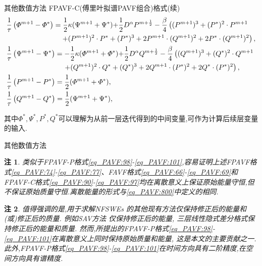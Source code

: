\documentclass[aspectratio=169]{beamer}
\newtheorem{remark}{注}[section] %
\numberwithin{theorem}{section} %
\numberwithin{equation}{section}%
\numberwithin{figure}{section}%
\numberwithin{table}{section}%
\begin{document}
\begin{frame}{其他数值方法}
	\noindent FPAVF-C(傅里叶拟谱PAVF组合)格式(续)
	{\small\begin{align}\footnotesize
	&\frac{1}{\tau}\left(\varPhi^{m+1}-\varPhi^{*}\right)=\frac{1}{2}\kappa (\Psi^{m+1}+\Psi^{*}){+\frac{1}{2}D^{\alpha} P^{m+\frac{1}{2}}}-\frac{\beta}{4}\left((P^{m+1})^3+(P^{*})^{2}\cdot P^{m+1}\right.\nonumber\\
			&~~~~~~~~~~~~~~~~~~~~~~~\left.+(P^{m+1})^{2}\cdot P^{*}+ (P^{*})^{3}+2 P^{m+1}\cdot (Q^{m+1})^{2}+2 P^{*}\cdot (Q^{m+1})^{2}\right),\label{eq_PAVF:94}\\
	&\frac{1}{\tau}\left(\Psi^{m+1}-\Psi^{*}\right)=-\frac{1}{2}\kappa (\varPhi^{m+1}+\varPhi^{*}){+\frac{1}{2}D^{\alpha} Q^{m+\frac{1}{2}}}-\frac{\beta}{4}\left((Q^{m+1})^3+(Q^{*})^{2}\cdot Q^{m+1}\right.\nonumber\\
			&~~~~~~~~~~~~~~~~~~~~~~~~\left.+(Q^{m+1})^{2}\cdot Q^{*}+ (Q^{*})^{3}+2 Q^{m+1}\cdot (P^{*})^{2}+2 Q^{*}\cdot (P^{*})^{2}\right),\label{eq_PAVF:95}\\
	&\frac{1}{\tau}\left(P^{m+1}-P^{*}\right)=\frac{1}{2}(\varPhi^{m+1}+\varPhi^{*}),\label{eq_PAVF:96}\\
	&\frac{1}{\tau}\left(Q^{m+1}-Q^{*}\right)=\frac{1}{2}(\Psi^{m+1}+\Psi^{*}),\label{eq_PAVF:97}
	\end{align}}
	
	\noindent 其中$\Phi^*, \Psi^*, P^*, Q^*$可以理解为从前一层迭代得到的中间变量,可作为计算后续层变量的输入.
\end{frame}
\begin{frame}{其他数值方法}

	\begin{remark}\label{rk_PAVF:1}
		类似于FPAVF-P格式\eqref{eq_PAVF:98}-\eqref{eq_PAVF:101},容易证明上述FPAVF格式\eqref{eq_PAVF:74}-\eqref{eq_PAVF:77}、FAVF格式\eqref{eq_PAVF:66}-\eqref{eq_PAVF:69}和FPAVF-C格式\eqref{eq_PAVF:90}-\eqref{eq_PAVF:97}均在离散意义上保证原始能量守恒,但不保证原始质量守恒.离散能量的形式与\eqref{eq_PAVF:800}中定义的相同.
		\end{remark}
		
		\begin{remark}\label{rk_PAVF:2}
		值得强调的是,用于求解NFSWEs  的其他现有方法仅保持修正后的能量和(或)修正后的质量.
		例如SAV方法 \cite{chengConvergenceEnergyconservingScheme2022}仅保持修正后的能量,
		三层线性隐式差分格式\cite{ranLinearlyImplicitConservative2016}保持修正后的能量和质量.
		然而,所提出的FPAVF-P格式\eqref{eq_PAVF:98}-\eqref{eq_PAVF:101}在离散意义上同时保持原始质量和能量, 这是本文的主要贡献之一.
		此外,FPAVF-P格式\eqref{eq_PAVF:98}-\eqref{eq_PAVF:101}在时间方向具有二阶精度,在空间方向具有谱精度.
		\end{remark}
\end{frame}
\end{document}
